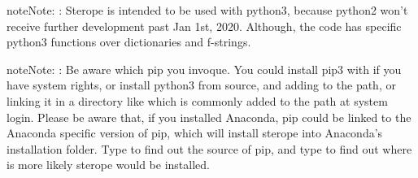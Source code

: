 \documentclass[letterpaper,10pt,english]{sphinxmanual}
\begin{document}
\begin{enumerate}
\begin{sphinxadmonition}{note}{Note:}
:
Sterope is intended to be used with python3, because python2 won’t receive
further development past Jan 1st, 2020. Although, the code has specific python3
functions over dictionaries and f-strings.
\end{sphinxadmonition}

\begin{sphinxadmonition}{note}{Note:}
:
Be aware which pip you invoque. You could install pip3 with
 if you have system rights, or
install python3 from source, and adding  to the
path, or linking it in a directory like  which is commonly
added to the path at system login. Please be aware that, if you installed
Anaconda, pip could be linked to the Anaconda specific version of pip, which
will install sterope into Anaconda’s installation folder.
Type  to find out the source of pip, and type 
to find out where is more likely sterope would be installed.
\end{sphinxadmonition}

\end{enumerate}
\end{document}
